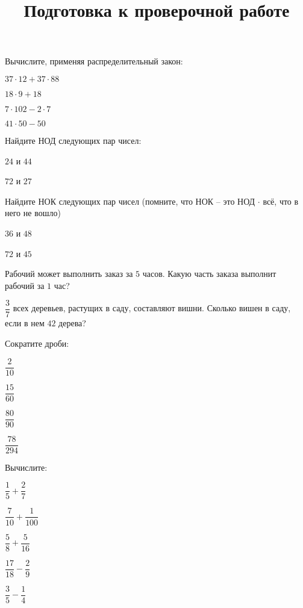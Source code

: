 \title{Подготовка к проверочной работе}
\begin{listofex}
	\item Вычислите, применяя распределительный закон:
	\begin{enumcols}[itemcolumns=4]
		\item \( 37\cdot12+37\cdot88 \)
		\item \( 18\cdot9+18\ \)
		\item \( 7\cdot102-2\cdot7 \)
		\item \( 41\cdot50-50 \)
	\end{enumcols}
	\item Найдите НОД следующих пар чисел:
	\begin{enumcols}[itemcolumns=2]
		\item \( 24 \) и \( 44 \)
		\item \( 72 \) и \( 27 \)
	\end{enumcols}
	\item Найдите НОК следующих пар чисел (помните, что НОК -- это НОД \( \cdot \) всё, что в него не вошло)
	\begin{enumcols}[itemcolumns=2]
		\item \( 36 \) и \( 48 \)
		\item \( 72 \) и \( 45 \)
	\end{enumcols}
	\item Рабочий может выполнить заказ за \( 5 \) часов. Какую часть заказа выполнит рабочий за \( 1  \) час?
	\item \( \dfrac{3}{7} \) всех деревьев, растущих в саду, составляют вишни. Сколько вишен в саду, если в нем \( 42  \) дерева?
	\item Сократите дроби:
		\begin{enumcols}[itemcolumns=4]
		\item \( \dfrac{2}{10} \)
		\item \( \dfrac{15}{60} \)
		\item \( \dfrac{80}{90} \)
		\item \( \dfrac{78}{294} \)
	\end{enumcols}
	\item Вычислите:
		\begin{enumcols}[itemcolumns=6]
		\item \( \dfrac{1}{5}+\dfrac{2}{7} \)
		\item \( \dfrac{7}{10}+\dfrac{1}{100} \)
		\item \( \dfrac{5}{8}+\dfrac{5}{16} \)
		\item \( \dfrac{17}{18}-\dfrac{2}{9} \)
		\item \( \dfrac{3}{5}-\dfrac{1}{4} \)

\end{enumcols}
\end{listofex}
